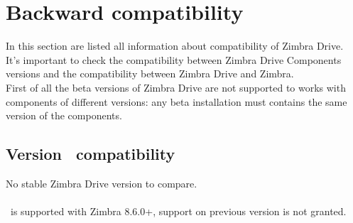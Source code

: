 \section{Backward compatibility}
In this section are listed all information about compatibility of Zimbra Drive.\\
It's important to check the compatibility between Zimbra Drive Components versions and
the compatibility between Zimbra Drive and Zimbra. \\

First of all the beta versions of Zimbra Drive are not supported to works with components of different versions:
any beta installation must contains the same version of the components.

\subsection{Version \version\ compatibility}
No stable Zimbra Drive version to compare.\\\\
\version\ is supported with Zimbra 8.6.0+, support on previous version is not granted.